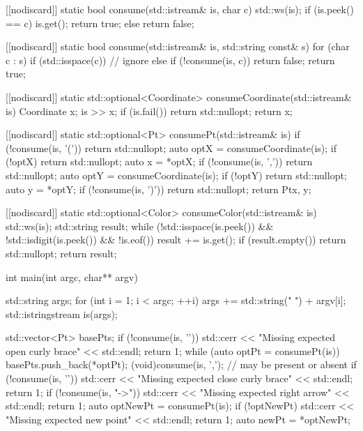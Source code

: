 \documentclass[11pt]{article}
\begin{document}
\begin{VerbatimOut}{\src}
[[nodiscard]] static bool consume(std::istream& is, char c) {
    std::ws(is);
    if (is.peek() == c) {
        is.get();
        return true;
    } else {
        return false;
    }
}

[[nodiscard]] static bool consume(std::istream& is, std::string const& s) {
    for (char c : s) {
        if (std::isspace(c)) {
            // ignore
        } else if (!consume(is, c)) {
            return false;
        }
    }
    return true;
}

[[nodiscard]] static std::optional<Coordinate> consumeCoordinate(std::istream& is) {
    Coordinate x;
    is >> x;
    if (is.fail()) {
        return std::nullopt;
    }
    return x;
}

[[nodiscard]] static std::optional<Pt> consumePt(std::istream& is) {
    if (!consume(is, '(')) {
        return std::nullopt;
    }
    auto optX = consumeCoordinate(is);
    if (!optX) {
        return std::nullopt;
    }
    auto x = *optX;
    if (!consume(is, ',')) {
        return std::nullopt;
    }
    auto optY = consumeCoordinate(is);
    if (!optY) {
        return std::nullopt;
    }
    auto y = *optY;
    if (!consume(is, ')')) {
        return std::nullopt;
    }
    return Pt{x, y};
}

[[nodiscard]] static std::optional<Color> consumeColor(std::istream& is) {
    std::ws(is);
    std::string result;
    while (!std::isspace(is.peek()) && !std::isdigit(is.peek()) && !is.eof()) {
        result += is.get();
    }
    if (result.empty()) {
        return std::nullopt;
    }
    return result;
}

int main(int argc, char** argv) {
    std::string args;
    for (int i = 1; i < argc; ++i) {
        args += std::string(" ") + argv[i];
    }
    std::istringstream is(args);

    std::vector<Pt> basePts;
    if (!consume(is, '{')) {
        std::cerr << "Missing expected open curly brace" << std::endl;
        return 1;
    }
    while (auto optPt = consumePt(is)) {
        basePts.push_back(*optPt);
        (void)consume(is, ','); // may be present or absent
    }
    if (!consume(is, '}')) {
        std::cerr << "Missing expected close curly brace" << std::endl;
        return 1;
    }
    if (!consume(is, "->")) {
        std::cerr << "Missing expected right arrow" << std::endl;
        return 1;
    }
    auto optNewPt = consumePt(is);
    if (!optNewPt) {
        std::cerr << "Missing expected new point" << std::endl;
        return 1;
    }
    auto newPt = *optNewPt;

}
\end{VerbatimOut}
\end{document}
